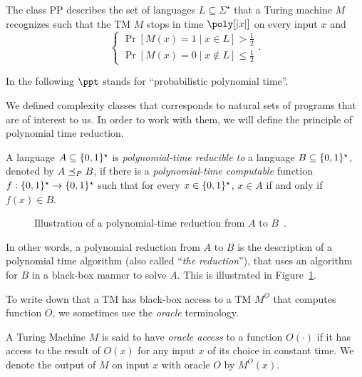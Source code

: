 \begin{definition} 
  The class \textsf{PP} describes the set of languages $L \subseteq \Sigma^\star$ that a Turing machine $M$ recognizes such that the TM $M$ stops in time $\poly[|x|]$ on every input $x$ and
  \[ \begin{cases}
      \Pr\left[ M(x) = 1 \mid x \in L \right] > \frac12\\
      \Pr\left[ M(x) = 0 \mid x \notin L \right] \leq \frac12
  \end{cases}. \]

  In the following $\ppt$ stands for ``probabilistic polynomial time''.
\end{definition}

We defined complexity classes that corresponds to natural sets of programs that are of interest to us.
In order to work with them, we will define the principle of polynomial time reduction.

\begin{definition} \label{de:pt-reduction} 
  A language $A \subseteq \{0,1\}^\star$ is \emph{polynomial-time reducible to} a language $B \subseteq \{0,1\}^\star$, denoted by $A \preceq_P B$, if there is a \emph{polynomial-time computable} function $f: \{0,1\}^\star \to \{0,1\}^\star$ such that for every $x \in \{0,1\}^\star$, $x \in A$ if and only if $f(x) \in B$.
\end{definition}

\begin{figure}
  \centering
  
  \caption[Illustration of a polynomial-time reduction from $A$ to $B$.]{Illustration of a polynomial-time reduction from $A$ to $B$~{\cite[Fig. 2.1]{AB09}}.} \label{fig:poly-reduction}
\end{figure}

In other words, a polynomial reduction from $A$ to $B$ is the description of a polynomial time algorithm (also called ``\emph{the reduction}''), that uses an algorithm for $B$ in a black-box manner to solve $A$.
This is illustrated in Figure~\ref{fig:poly-reduction}.

To write down that a TM has black-box access to a TM $M^O$ that computes function $O$, we sometimes use the \textit{oracle} terminology.

\begin{definition} 
  A Turing Machine $M$ is said to have \textit{oracle access} to a function $O(\cdot)$ if it has access to the result of $O(x)$ for any input $x$ of its choice in constant time. We denote the output of $M$ on input $x$ with oracle $O$ by $M^O(x)$.
\end{definition}

